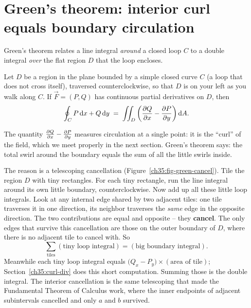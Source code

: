 \section{Green's theorem: interior curl equals boundary circulation}
\label{ch35:green}

Green's theorem relates a line integral \emph{around} a closed loop $C$ to a double
integral \emph{over} the flat region $D$ that the loop encloses.

\begin{theorem}
\label{ch35:thm-green}
Let $D$ be a region in the plane bounded by a simple closed curve $C$ (a loop that
does not cross itself), traversed counterclockwise, so that $D$ is on your left as
you walk along $C$. If $\vec F=(P,Q)$ has continuous partial derivatives on $D$, then
\[
  \oint_C P\,\mathrm{d} x + Q\,\mathrm{d} y \;=\; \iint_D \left(\frac{\partial Q}{\partial x} - \frac{\partial P}{\partial y}\right)\mathrm{d} A.
\]
\end{theorem}

The quantity $\frac{\partial Q}{\partial x}-\frac{\partial P}{\partial y}$ measures circulation at a single point: it is
the ``curl'' of the field, which we meet properly in the next section. Green's theorem
says: the total swirl around the boundary equals the sum of all the little swirls
inside.

\begin{happeningbox}
The reason is a telescoping cancellation (Figure~\ref{ch35:fig-green-cancel}).
Tile the region $D$ with tiny
rectangles. For each tiny rectangle, run the line integral around its own little
boundary, counterclockwise. Now add up all these little loop integrals. Look at
any internal edge shared by two adjacent tiles: one tile traverses it
in one direction, its neighbor traverses the \emph{same} edge in the opposite direction. The two
contributions are equal and opposite -- they \textbf{cancel}. The only edges that survive this
cancellation are those on the outer boundary of $D$, where there is no adjacent tile
to cancel with. So
\[
  \sum_{\text{tiles}} (\text{tiny loop integral}) = (\text{big boundary integral}).
\]
Meanwhile each tiny loop integral equals
$\big(Q_x - P_y\big)\times(\text{area of tile})$; Section~\ref{ch35:curl-div}
does this short computation. Summing those is the double
integral. The interior cancellation is the same telescoping that
made the Fundamental Theorem of Calculus work, where the inner endpoints of
adjacent subintervals cancelled and only $a$ and $b$ survived.
\end{happeningbox}

